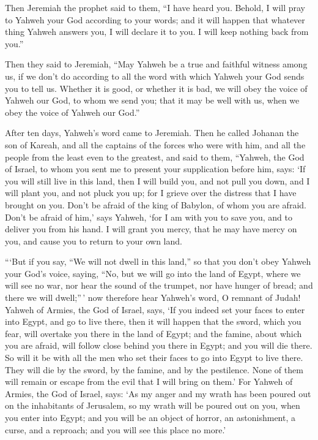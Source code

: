  Then Jeremiah the prophet said to them, ``I have heard you.
Behold, I will pray to Yahweh your God according to your words; and it
will happen that whatever thing Yahweh answers you, I will declare it to
you. I will keep nothing back from you.''

 Then they said to Jeremiah, ``May Yahweh be a true and
faithful witness among us, if we don't do according to all the word with
which Yahweh your God sends you to tell us.  Whether it is
good, or whether it is bad, we will obey the voice of Yahweh our God, to
whom we send you; that it may be well with us, when we obey the voice of
Yahweh our God.''

 After ten days, Yahweh's word came to Jeremiah.
 Then he called Johanan the son of Kareah, and all the
captains of the forces who were with him, and all the people from the
least even to the greatest,  and said to them, ``Yahweh, the
God of Israel, to whom you sent me to present your supplication before
him, says:  `If you will still live in this land, then I
will build you, and not pull you down, and I will plant you, and not
pluck you up; for I grieve over the distress that I have brought on you.
 Don't be afraid of the king of Babylon, of whom you are
afraid. Don't be afraid of him,' says Yahweh, `for I am with you to save
you, and to deliver you from his hand.  I will grant you
mercy, that he may have mercy on you, and cause you to return to your
own land.

 ```But if you say, ``We will not dwell in this land,'' so
that you don't obey Yahweh your God's voice,  saying, ``No,
but we will go into the land of Egypt, where we will see no war, nor
hear the sound of the trumpet, nor have hunger of bread; and there we
will dwell;''\,'  now therefore hear Yahweh's word, O
remnant of Judah! Yahweh of Armies, the God of Israel, says, `If you
indeed set your faces to enter into Egypt, and go to live there,
 then it will happen that the sword, which you fear, will
overtake you there in the land of Egypt; and the famine, about which you
are afraid, will follow close behind you there in Egypt; and you will
die there.  So will it be with all the men who set their
faces to go into Egypt to live there. They will die by the sword, by the
famine, and by the pestilence. None of them will remain or escape from
the evil that I will bring on them.'  For Yahweh of Armies,
the God of Israel, says: `As my anger and my wrath has been poured out
on the inhabitants of Jerusalem, so my wrath will be poured out on you,
when you enter into Egypt; and you will be an object of horror, an
astonishment, a curse, and a reproach; and you will see this place no
more.'

